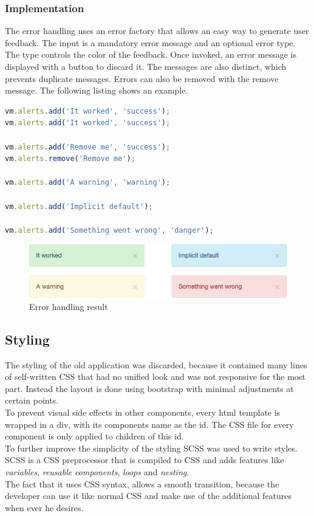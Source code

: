 \subsubsection{Implementation}
The error handling uses an error factory that allows an easy way to generate user feedback. The input is a mandatory error message and an optional error type. The type controls the color of the feedback. Once invoked, an error message is displayed with a button to discard it. The messages are also distinct, which prevents duplicate messages. Errors can also be removed with the remove message. The following listing shows an example. 
\begin{lstlisting}[language=javascript, caption=Error handling]
vm.alerts.add('It worked', 'success');
vm.alerts.add('It worked', 'success');

vm.alerts.add('Remove me', 'success');
vm.alerts.remove('Remove me');

vm.alerts.add('A warning', 'warning');

vm.alerts.add('Implicit default');

vm.alerts.add('Something went wrong', 'danger');
\end{lstlisting}
\begin{figure}[H]
	\centering\includegraphics[width=1\textwidth]{res/alerts}
	\caption{Error handling result}
\end{figure}


\subsection{Styling}
\label{sec:styling}
The styling of the old application was discarded, because it contained many lines of self-written CSS that had no unified look and was not responsive for the most part. Instead the layout is done using bootstrap with minimal adjustments at certain points.\\
To prevent visual side effects in other components, every html template is wrapped in a div, with its components name as the id. The CSS file for every component is only applied to children of this id.\\
To further improve the simplicity of the styling SCSS was used to write styles. SCSS is a CSS preprocessor that is compiled to CSS and adds features like \textit{variables}, \textit{reusable} \textit{components}, \textit{loops} and \textit{nesting}.\\
The fact that it uses CSS syntax, allows a smooth transition, because the developer can use it like normal CSS and make use of the additional features when ever he desires.
